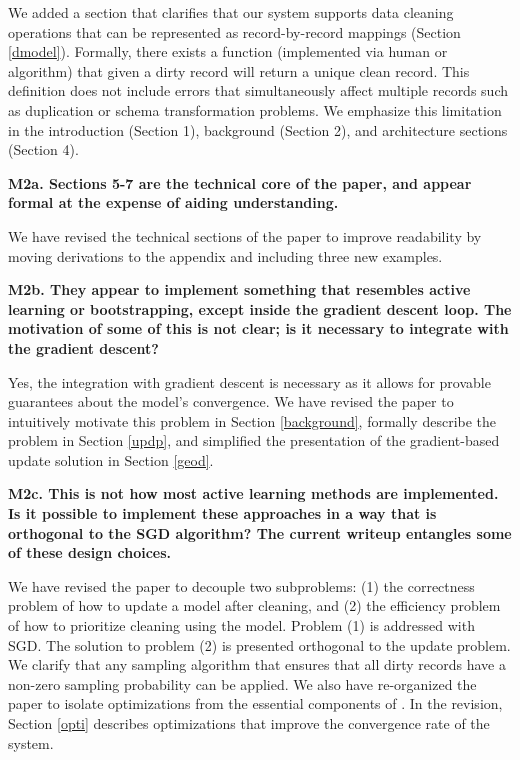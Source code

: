 \vspace{0.5em}

We added a section that clarifies that our system supports data cleaning operations that can be represented as record-by-record mappings (Section \ref{dmodel}).
Formally, there exists a function (implemented via human or algorithm) that given a dirty record will return a unique clean record.
This definition does not include errors that simultaneously affect multiple records such as duplication or schema transformation problems.
We emphasize this limitation in the introduction (Section 1), background (Section 2), and architecture sections (Section 4).


\vspace{0.5em}

\noindent\textbf{M2a. Sections 5-7 are the technical core of the paper, and appear formal at the expense of aiding understanding.}

We have revised the technical sections of the paper to improve readability by moving derivations to the appendix and including three new examples.

\vspace{0.5em}

\noindent \textbf{M2b. They appear to implement something that resembles active learning or bootstrapping, except inside the gradient descent loop. The motivation of some of this is not clear; is it necessary to integrate with the gradient descent?} 

Yes, the integration with gradient descent is necessary as it allows for provable guarantees about the model's convergence.
We have revised the paper to intuitively motivate this problem in Section \ref{background}, formally describe the problem in Section \ref{updp}, and simplified the presentation of the gradient-based update solution in Section \ref{geod}.

\vspace{0.5em}

\noindent\textbf{M2c. This is not how most active learning methods are implemented. Is it possible to implement these approaches in a way that is orthogonal to the SGD algorithm? The current writeup entangles some of these design choices.} 

We have revised the paper to decouple two subproblems: (1) the correctness problem of how to update a model after cleaning, and (2) the efficiency problem of how to prioritize cleaning using the model. 
Problem (1) is addressed with SGD.
The solution to problem (2) is presented orthogonal to the update problem.
We clarify that any sampling algorithm that ensures that all dirty records have a non-zero sampling probability can be applied.
We also have re-organized the paper to isolate optimizations from the essential components of \sys.
In the revision, Section \ref{opti} describes optimizations that improve the convergence rate of the system.

